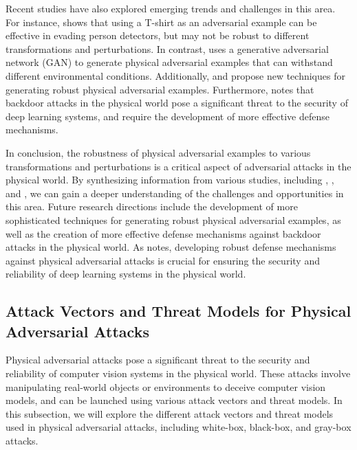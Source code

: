 \documentclass[11pt,a4paper]{article}
\begin{document}
Recent studies have also explored emerging trends and challenges in this area. For instance, \cite{arxiv:1910.11099} shows that using a T-shirt as an adversarial example can be effective in evading person detectors, but may not be robust to different transformations and perturbations. In contrast, \cite{doi:10.1109/cvpr42600.2020.01426} uses a generative adversarial network (GAN) to generate physical adversarial examples that can withstand different environmental conditions. Additionally, \cite{doi:10.1109/cvpr52688.2022.01487} and \cite{arxiv:2007.04137} propose new techniques for generating robust physical adversarial examples. Furthermore, \cite{doi:10.1109/cvpr46437.2021.00614} notes that backdoor attacks in the physical world pose a significant threat to the security of deep learning systems, and require the development of more effective defense mechanisms.

In conclusion, the robustness of physical adversarial examples to various transformations and perturbations is a critical aspect of adversarial attacks in the physical world. By synthesizing information from various studies, including \cite{doi:10.1201/9781351251389-8}, \cite{doi:10.1145/3319535.3339815}, and \cite{arxiv:2007.16118}, we can gain a deeper understanding of the challenges and opportunities in this area. Future research directions include the development of more sophisticated techniques for generating robust physical adversarial examples, as well as the creation of more effective defense mechanisms against backdoor attacks in the physical world. As \cite{doi:10.1109/asp-dac47756.2020.9045584} notes, developing robust defense mechanisms against physical adversarial attacks is crucial for ensuring the security and reliability of deep learning systems in the physical world.


\subsection{Attack Vectors and Threat Models for Physical Adversarial Attacks}


Physical adversarial attacks pose a significant threat to the security and reliability of computer vision systems in the physical world. These attacks involve manipulating real-world objects or environments to deceive computer vision models, and can be launched using various attack vectors and threat models. In this subsection, we will explore the different attack vectors and threat models used in physical adversarial attacks, including white-box, black-box, and gray-box attacks.
\end{document}
